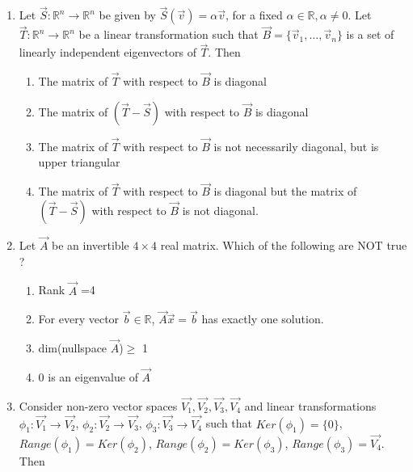 \renewcommand{\theequation}{\theenumi}
\renewcommand{\thefigure}{\theenumi}
\begin{enumerate}[label=\thesection.\arabic*.,ref=\thesection.\theenumi]

\item Let $\vec{S}: \mathbb R^n \rightarrow \mathbb R^n$ be given by $\vec{S}(\vec{v}) = \alpha\vec{v}$, for a fixed $\alpha \in \mathbb R, \alpha \neq 0$. Let $\vec{T}: \mathbb R^n \rightarrow \mathbb R^n$ be a linear transformation such that $\vec{B} = \{ \vec{v}_1,\ldots,\vec{v}_n \}$ is a set of linearly independent eigenvectors of $\vec{T}$. Then
\begin{enumerate}
    \item The matrix of $\vec{T}$ with respect to $\vec{B}$ is diagonal
    \item The matrix of $(\vec{T}-\vec{S})$ with respect to $\vec{B}$ is diagonal
    \item The matrix of $\vec{T}$ with respect to $\vec{B}$ is not necessarily diagonal, but is upper triangular
    \item The matrix of $\vec{T}$ with respect to $\vec{B}$ is diagonal but the matrix of $(\vec{T}-\vec{S})$ with respect to $\vec{B}$ is not diagonal.
\end{enumerate}
%
\solution


\item Let $\vec{A}$ be an invertible $4 \times 4$ real matrix. Which of the following are NOT true ? 
\begin{enumerate}
\item  Rank $\vec{A}$ =4
\item For every vector $\vec{b} \in \mathbb{R}$, $\vec{A}\vec{x}=\vec{b}$ has exactly one solution. 
\item dim(nullspace $\vec{A}$)$\geq$ 1
\item 0 is an eigenvalue of $\vec{A}$
\end{enumerate}
%
\solution

\item 	Consider non-zero vector spaces $\vec{V_1}, \vec{V_2}, \vec{V_3}, \vec{V_4}$ and linear transformations $\phi_1 : \vec{V_1} \rightarrow \vec{V_2}$, $\phi_2 : \vec{V_2} \rightarrow \vec{V_3}$, $\phi_3 : \vec{V_3} \rightarrow \vec{V_4}$ such that $Ker(\phi_1) = \{0\}$, $Range(\phi_1) = Ker(\phi_2)$, $Range(\phi_2) = Ker(\phi_3)$, $Range(\phi_3) = \vec{V_4}$. Then \\
	

\end{enumerate}
